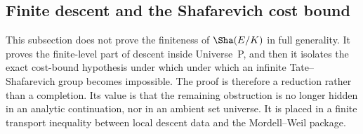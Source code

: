\documentclass[10pt, reqno]{amsart}
\theoremstyle{plain}
\theoremstyle{definition}
\theoremstyle{plain}
\begin{document}
\subsection{Finite descent and the Shafarevich cost bound}
\label{subsec:ShaFinitenessCostBound}

This subsection does not prove the finiteness of $\Sha(E/K)$ in full generality. It proves the finite-level part of descent inside Universe~P, and then it isolates the exact cost-bound hypothesis under which under which an infinite Tate--Shafarevich group becomes impossible. The proof is therefore a reduction rather than a completion. Its value is that the remaining obstruction is no longer hidden in an analytic continuation, nor in an ambient set universe. It is placed in a finite transport inequality between local descent data and the Mordell--Weil package.
\end{document}
